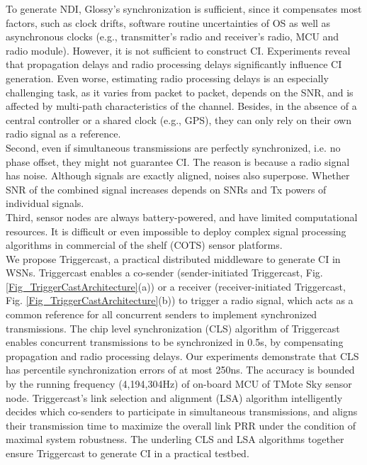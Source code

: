 \documentclass[conference]{IEEEtran}
\begin{document}
To generate NDI, Glossy's synchronization is sufficient, since it compensates most factors, such as clock drifts, software routine uncertainties of OS as well as asynchronous clocks (e.g., transmitter's radio and receiver's radio, MCU and radio module).
However, it is not sufficient to construct CI.
Experiments reveal that propagation delays and radio processing delays significantly influence CI generation.
Even worse, estimating radio processing delays is an especially challenging task, as it varies from packet to packet, depends on the SNR, and is affected by multi-path characteristics of the channel.
Besides, in the absence of a central controller or a shared clock (e.g., GPS), they can only rely on their own radio signal as a reference.\\
\indent Second, even if simultaneous transmissions are perfectly synchronized, i.e. no phase offset, they might not guarantee CI. The reason is because a radio signal has noise. Although signals are exactly aligned, noises also superpose. Whether SNR of the combined signal increases depends on SNRs and Tx powers of individual signals.\\
\indent Third, sensor nodes are always battery-powered, and have limited computational resources. It is difficult or even impossible to deploy complex signal processing algorithms in commercial of the shelf (COTS) sensor platforms.\\
\indent We propose Triggercast, a practical distributed middleware to generate CI in WSNs.
Triggercast enables a co-sender (sender-initiated Triggercast, Fig. \ref{Fig_TriggerCastArchitecture}(a)) or a receiver (receiver-initiated Triggercast, Fig. \ref{Fig_TriggerCastArchitecture}(b)) to trigger a radio signal, which acts as a common reference for all concurrent senders to implement synchronized transmissions.
The chip level synchronization (CLS) algorithm of Triggercast enables concurrent transmissions to be synchronized in 0.5s, by compensating propagation and radio processing delays.
Our experiments demonstrate that CLS has  percentile synchronization errors of at most 250ns.
The accuracy is bounded by the running frequency (4,194,304Hz) of on-board MCU of TMote Sky sensor node.
Triggercast's link selection and alignment (LSA) algorithm intelligently decides which co-senders to participate in simultaneous
transmissions, and aligns their transmission time to maximize the overall link PRR under the condition of maximal system robustness.
The underling CLS and LSA algorithms together ensure Triggercast to generate CI in a practical testbed.
\end{document}
